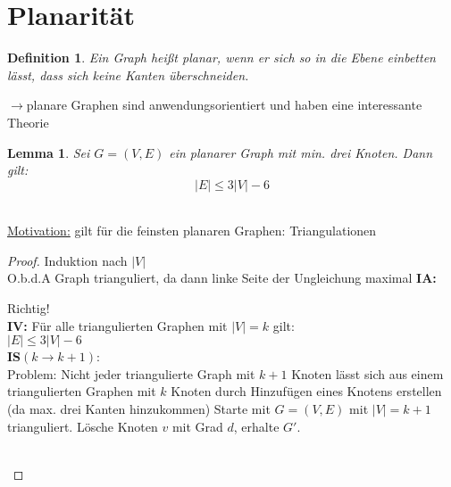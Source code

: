 \documentclass[12pt]{article}
\numberwithin{equation}{subsection}
\newtheorem{df}{Definition}
\newtheorem{lemma}{Lemma}
\begin{document}
	\section{Planarität}
	\begin{df}
		Ein Graph heißt \textit{planar}, wenn er sich so in die Ebene einbetten lässt, dass sich keine Kanten überschneiden.
	\end{df}
	$\to$planare Graphen sind anwendungsorientiert und haben eine interessante Theorie
	\begin{lemma}
		Sei $G=(V,E)$ ein planarer Graph mit min. drei Knoten. Dann gilt:\\
		$$|E|\leq 3|V|-6$$\\
	\end{lemma}
	\underline{Motivation:} gilt für die feinsten planaren Graphen: Triangulationen
	\begin{proof}
		Induktion nach $|V|$\\
		O.b.d.A Graph trianguliert, da dann linke Seite der Ungleichung maximal
		\textbf{IA:}
		Richtig!\\
		\textbf{IV:} Für alle triangulierten Graphen mit $|V|=k$ gilt:\\
		$|E|\leq 3|V|-6$\\
		\textbf{IS}$(k\to k+1)$:\\
		Problem: Nicht jeder triangulierte Graph mit $k+1$ Knoten lässt sich aus einem triangulierten Graphen mit $k$ Knoten durch Hinzufügen eines Knotens erstellen (da max. drei Kanten hinzukommen)
		Starte mit $G=(V,E)$ mit $|V|=k+1$ trianguliert. Lösche Knoten $v$ mit Grad $d$, erhalte $G'$.
		\\

\end{proof}
\end{document}
